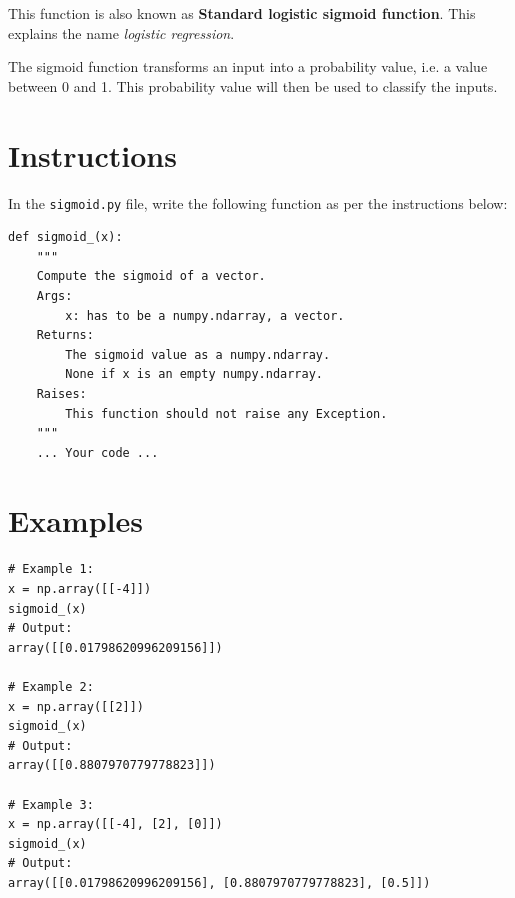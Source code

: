 \documentclass{42-en}
\begin{document}
This function is also known as \textbf{Standard logistic sigmoid function}.
This explains the name \textit{logistic regression}.

The sigmoid function transforms an input into a probability value, i.e. a value between 0 and 1.  
This probability value will then be used to classify the inputs.

\section*{Instructions}
In the \texttt{sigmoid.py} file, write the following function as per the instructions below:

\par

\begin{verbatim}
def sigmoid_(x):
    """
    Compute the sigmoid of a vector.
    Args:
        x: has to be a numpy.ndarray, a vector.
    Returns: 
        The sigmoid value as a numpy.ndarray.
        None if x is an empty numpy.ndarray.
    Raises:
        This function should not raise any Exception.
    """
    ... Your code ...
\end{verbatim}

\section*{Examples}

\begin{verbatim}
# Example 1:
x = np.array([[-4]])
sigmoid_(x)
# Output:
array([[0.01798620996209156]])

# Example 2:
x = np.array([[2]])
sigmoid_(x)
# Output:
array([[0.8807970779778823]])

# Example 3:
x = np.array([[-4], [2], [0]])
sigmoid_(x)
# Output:
array([[0.01798620996209156], [0.8807970779778823], [0.5]])
\end{verbatim}



\end{document}
